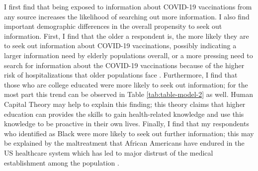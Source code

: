 I first find that being exposed to information about COVID-19 vaccinations from
any source increases the likelihood of searching out more information. I also
find important demographic differences in the overall propensity to seek out
information. First, I find that the older a respondent is, the more likely they
are to seek out information about COVID-19 vaccinations, possibly indicating a
larger information need by elderly populations overall, or a more pressing need
to search for information about the COVID-19 vaccinations because of the higher
risk of hospitalizations that older populations face \citep{turner_etal18}.
Furthermore, I find that those who are college educated were more likely to seek
out information; for the most part this trend can be observed in Table
\ref{tab:table-model-2} as well. Human Capital Theory \citep{mirowsky_ross98}
may help to explain this finding; this theory claims that higher education can
provides the skills to gain health-related knowledge and use this knowledge to
be proactive in their own lives. Finally, I find that my respondents who
identified as Black were more likely to seek out further information; this may
be explained by the maltreatment that African Americans have endured in the US
healthcare system \citep{baileyStructuralRacismHealth2017} which has led to
major distrust of the medical establishment among the population
\citep{center2019, murray15, bronson2014don}.

